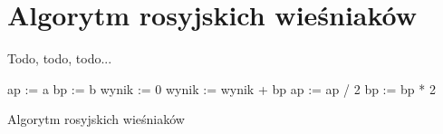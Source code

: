 \section{Algorytm rosyjskich wieśniaków}

Todo, todo, todo...

\begin{algorithm}[h]
  ap := a\;
  bp := b\;
  wynik := 0\;
  {
    {
      wynik := wynik + bp\;
    }
    ap := ap / 2\;
    bp := bp * 2\;
  }
  
  \caption{Algorytm rosyjskich wieśniaków}
  \label{alg-wiesniakow}
\end{algorithm}